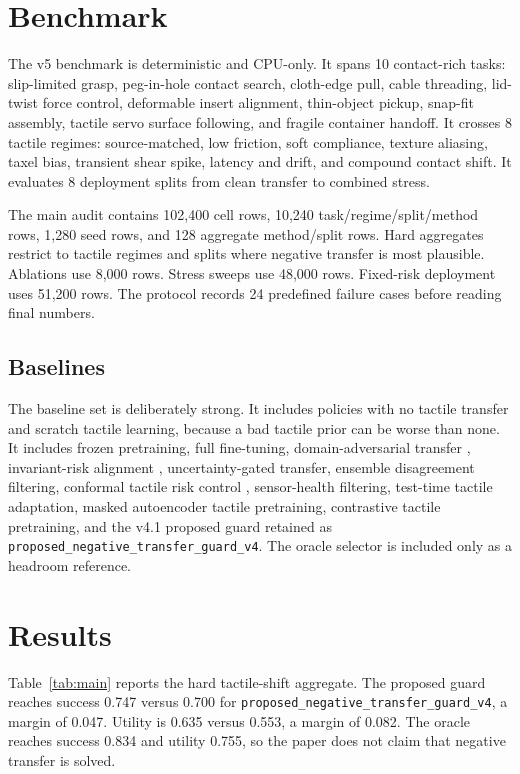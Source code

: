 \documentclass{article}
\begin{document}
\section{Benchmark}
The v5 benchmark is deterministic and CPU-only. It spans 10 contact-rich tasks: slip-limited grasp, peg-in-hole contact search, cloth-edge pull, cable threading, lid-twist force control, deformable insert alignment, thin-object pickup, snap-fit assembly, tactile servo surface following, and fragile container handoff. It crosses 8 tactile regimes: source-matched, low friction, soft compliance, texture aliasing, taxel bias, transient shear spike, latency and drift, and compound contact shift. It evaluates 8 deployment splits from clean transfer to combined stress.

The main audit contains 102,400 cell rows, 10,240 task/regime/split/method rows, 1,280 seed rows, and 128 aggregate method/split rows. Hard aggregates restrict to tactile regimes and splits where negative transfer is most plausible. Ablations use 8,000 rows. Stress sweeps use 48,000 rows. Fixed-risk deployment uses 51,200 rows. The protocol records 24 predefined failure cases before reading final numbers.

\subsection{Baselines}
The baseline set is deliberately strong. It includes policies with no tactile transfer and scratch tactile learning, because a bad tactile prior can be worse than none. It includes frozen pretraining, full fine-tuning, domain-adversarial transfer \citep{ganin2016domain}, invariant-risk alignment \citep{arjovsky2019invariant}, uncertainty-gated transfer, ensemble disagreement filtering, conformal tactile risk control \citep{vovk2005algorithmic}, sensor-health filtering, test-time tactile adaptation, masked autoencoder tactile pretraining, contrastive tactile pretraining, and the v4.1 proposed guard retained as \texttt{proposed\_negative\_transfer\_guard\_v4}. The oracle selector is included only as a headroom reference.

\section{Results}
Table~\ref{tab:main} reports the hard tactile-shift aggregate. The proposed guard reaches success 0.747 versus 0.700 for \texttt{proposed\_negative\_transfer\_guard\_v4}, a margin of 0.047. Utility is 0.635 versus 0.553, a margin of 0.082. The oracle reaches success 0.834 and utility 0.755, so the paper does not claim that negative transfer is solved.
\end{document}
